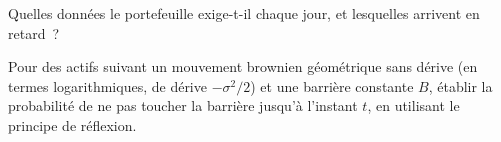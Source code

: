 \begin{interviewq}\label{iq:s2:capital-structure-arbitrage:5}
Quelles données le portefeuille exige-t-il chaque jour, et lesquelles arrivent en retard~?
\end{interviewq}

\begin{interviewq}\label{iq:s2:capital-structure-arbitrage:6}
Pour des actifs suivant un mouvement brownien géométrique sans dérive (en termes logarithmiques, de dérive $-\sigma^2/2$) et une barrière constante $B$, établir la probabilité de
ne pas toucher la barrière jusqu'à l'instant $t$, en utilisant le principe de réflexion.
\end{interviewq}
